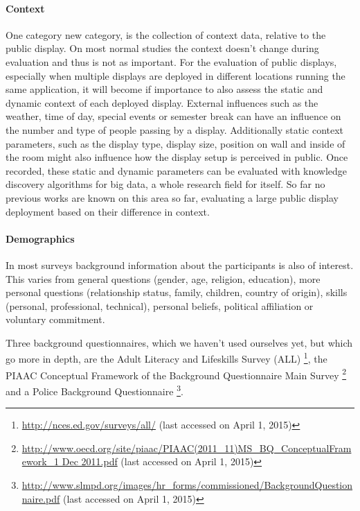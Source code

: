 	\paragraph{Context}

		One category new category, is the collection of context data, relative to the public display. On most normal studies the context doesn't change during evaluation and thus is not as important. For the evaluation of public displays, especially when multiple displays are deployed in different locations running the same application, it will become if importance to also assess the static and dynamic context of each deployed display. External influences such as the weather, time of day, special events or semester break can have an influence on the number and type of people passing by a display. Additionally static context parameters, such as the display type, display size, position on wall and inside of the room might also influence how the display setup is perceived in public. Once recorded, these static and dynamic parameters can be evaluated with knowledge discovery algorithms for big data, a whole research field for itself. 
		So far no previous works are known on this area so far, evaluating a large public display deployment based on their difference in context.

	\paragraph{Demographics}

		In most surveys background information about the participants is also of interest. This varies from general questions (gender, age, religion, education), more personal questions (relationship status, family, children, country of origin), skills (personal, professional, technical), personal beliefs, political affiliation or voluntary commitment.

		Three background questionnaires, which we haven't used ourselves yet, but which go more in depth, are the Adult Literacy and Lifeskills Survey (ALL) \footnote{\url{http://nces.ed.gov/surveys/all/} (last accessed on April 1, 2015)}, the PIAAC Conceptual Framework of the Background Questionnaire Main Survey \footnote{\url{http://www.oecd.org/site/piaac/PIAAC(2011_11)MS_BQ_ConceptualFramework_1 Dec 2011.pdf} (last accessed on April 1, 2015)} and a Police Background Questionnaire \footnote{\url{http://www.slmpd.org/images/hr_forms/commissioned/BackgroundQuestionnaire.pdf} (last accessed on April 1, 2015)}.



